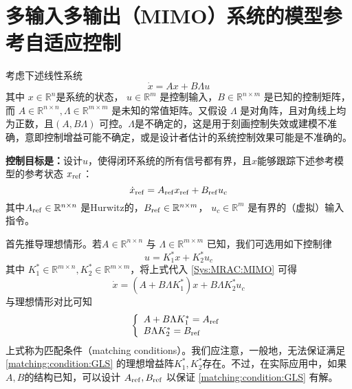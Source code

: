 \section{多输入多输出（MIMO）系统的模型参考自适应控制}\label{4Cref}
考虑下述线性系统
\begin{equation}
  \dot{x} = A  x + B \Lambda u\label{Sys:MRAC:MIMO}
\end{equation}
其中 $x \in \mathbb{R}^n$是系统的状态， $u \in \mathbb{R}^m$ 是控制输入，$B \in \mathbb{R}^{n \times m}$ 是已知的控制矩阵，而 $A \in \mathbb{R}^{n \times n}, \Lambda \in \mathbb{R}^{m \times m}$ 是未知的常值矩阵。又假设  $\Lambda$ 是对角阵，且对角线上均为正数，且$(A, B \Lambda)$ 可控。$\Lambda$是不确定的，这是用于刻画控制失效或建模不准确，意即控制增益可能不确定，或是设计者估计的系统控制效果可能是不准确的。

{\bf 控制目标是：}设计$u$，使得闭环系统的所有信号都有界，且$x$能够跟踪下述参考模型的参考状态 $x_{\operatorname{ref}}$：
 \begin{equation}
    \dot{x}_{\operatorname{ref}} =
    A_{\operatorname{ref}} x_{\operatorname{ref}} +
    B_{\operatorname{ref}} u_c\label{ideal_mimo}
  \end{equation}
其中$A_{\operatorname{ref}} \in \mathbb{R}^{n \times n}$ 是Hurwitz的，$B_{\operatorname{ref}} \in \mathbb{R}^{n \times m}$， $u_c \in \mathbb{R}^m$ 是有界的（虚拟）输入指令。

首先推导理想情形。若$A \in \mathbb{R}^{n \times n}$ 与 $\Lambda \in \mathbb{R}^{m\times m}$ 已知，我们可选用如下控制律
\[ u = K^{\ast}_1 x + K^{\ast}_2 u_c \]
其中 $K^{\ast}_1 \in \mathbb{R}^{m \times n}, K^{\ast}_2 \in \mathbb{R}^{m
\times m}$，将上式代入 \eqref{Sys:MRAC:MIMO} 可得
\[ \dot{x} = (A + B \Lambda K^{\ast}_1) x + B \Lambda K^{\ast}_2 u_c \]
与理想情形对比可知
\begin{equation}
  \left\{\begin{array}{l}
    A + B \Lambda K^{\ast}_1 = A_{\operatorname{ref}}\\
    B \Lambda K^{\ast}_2 = B_{\operatorname{ref}}
  \end{array}\right. \label{matching:condition:GLS}
\end{equation}
上式称为匹配条件（matching conditions）。我们应注意，一般地，无法保证满足 \eqref{matching:condition:GLS} 的理想增益阵$K^{\ast}_1, K^{\ast}_2$存在。不过，在实际应用中，如果$A, B$的结构已知，可以设计 $A_{\operatorname{ref}}, B_{\operatorname{ref}}$ 以保证 \eqref{matching:condition:GLS} 有解。

